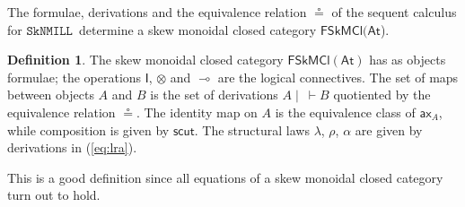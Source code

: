 \documentclass[copyright,creativecommons]{eptcs}
\theoremstyle{definition}
\newtheorem{defn}{Definition}[section]
\newcommand{\ax}{\mathsf{ax}}
\newcommand{\ot}{\otimes}
\newcommand{\lolli}{\multimap}
\newcommand{\I}{\mathsf{I}}
\newcommand{\SkNMILL}{$\mathtt{SkNMILL}$}
\newcommand{\FSkMCC}{\mathsf{FSkMCl}}
\begin{document}
The formulae, derivations and the equivalence relation $\circeq$ of the sequent calculus for \SkNMILL\ determine a skew monoidal closed category $\FSkMCC(\mathsf{At}$).
\begin{defn}\label{def:fskmcc}
  The skew monoidal closed category $\FSkMCC(\mathsf{At})$ has
  as objects formulae; the operations $\I$, $\ot$ and $\lolli$ are the logical connectives. The set of maps between objects $A$ and $B$ is the set of derivations $A \mid ~ \vdash B$ quotiented by the equivalence relation $\circeq$. The identity map on $A$ is the equivalence class of $\ax_A$, while composition is given by $\mathsf{scut}$. The structural laws $\lambda$, $\rho$, $\alpha$ are given by derivations in (\ref{eq:lra}).
\end{defn}
 This is a good definition since all equations of a skew monoidal closed category turn out to hold.
\end{document}
